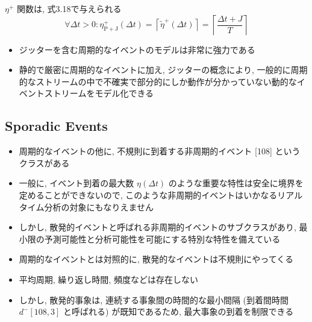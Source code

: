\begin{frame}{}
    $\eta^{+}$ 関数は, 式3.18で与えられる
    \begin{equation*}
        \forall \Delta t>0: \eta_{\mathrm{P+J}}^{+}(\Delta t)=\left\lceil\tilde{\eta}^{+}(\Delta t)\right\rceil=\left\lceil\frac{\Delta t+J}{T}\right\rceil
    \end{equation*}
\end{frame}

\begin{frame}{}
    \begin{itemize}
        \item ジッターを含む周期的なイベントのモデルは非常に強力である
        \item 静的で厳密に周期的なイベントに加え, ジッターの概念により, 一般的に周期的なストリームの中で不確実で部分的にしか動作が分かっていない動的なイベントストリームをモデル化できる
    \end{itemize}
\end{frame}


\subsection{Sporadic Events}
\label{ssec: sporadic events}

\begin{frame}{}
    \begin{itemize}
        \item 周期的なイベントの他に, 不規則に到着する非周期的イベント [108] というクラスがある
        \item 一般に, イベント到着の最大数 $\eta(\Delta t)$ のような重要な特性は安全に境界を定めることができないので, このような非周期的イベントはいかなるリアルタイム分析の対象にもなりえません
        \item しかし, 散発的イベントと呼ばれる非周期的イベントのサブクラスがあり, 最小限の予測可能性と分析可能性を可能にする特別な特性を備えている
    \end{itemize}
\end{frame}

\begin{frame}{}
    \begin{itemize}
        \item 周期的なイベントとは対照的に, 散発的なイベントは不規則にやってくる
        \item 平均周期, 繰り返し時間, 頻度などは存在しない
        \item しかし, 散発的事象は, 連続する事象間の時間的な最小間隔 (到着間時間 $d^{-}[108,3]$ と呼ばれる) が既知であるため, 最大事象の到着を制限できる
    \end{itemize}
\end{frame}

